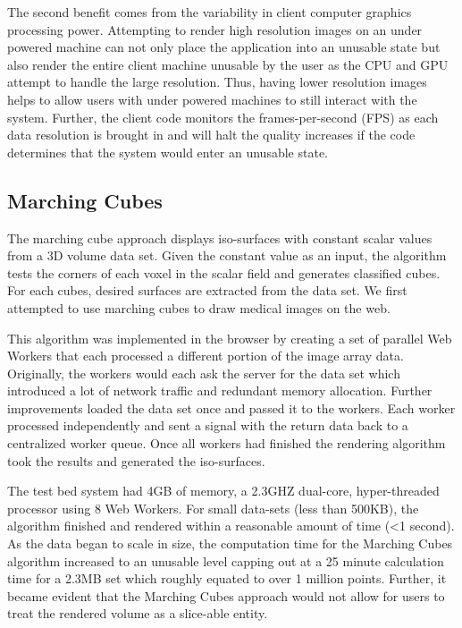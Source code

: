 \documentclass[annual]{acmsiggraph}
\begin{document}
The second benefit comes from the variability in client computer graphics processing power.  Attempting to render high resolution images on an under powered machine can not only place the application into an unusable state but also render the entire client machine unusable by the user as the CPU and GPU attempt to handle the large resolution.  Thus, having lower resolution images helps to allow users with under powered machines to still interact with the system.  Further, the client code monitors the frames-per-second (FPS) as each data resolution is brought in and will halt the quality increases if the code determines that the system would enter an unusable state.

\subsection{Marching Cubes}
	The marching cube \cite{lorensen:1987} approach displays iso-surfaces with constant scalar values from a 3D volume data set. Given the constant value as an input, the algorithm tests the corners of each voxel in the scalar field and generates classified cubes. For each cubes, desired surfaces are extracted from the data set. We first attempted to use marching cubes to draw medical images on the web.

	This algorithm was implemented in the browser by creating a set of parallel Web Workers that each processed a different portion of the image array data.  Originally, the workers would each ask the server for the data set which introduced a lot of network traffic and redundant memory allocation.  Further improvements loaded the data set once and passed it to the workers.  Each worker processed independently and sent a signal with the return data back to a centralized worker queue.  Once all workers had finished the rendering algorithm took the results and generated the iso-surfaces.  
	
	The test bed system had 4GB of memory, a 2.3GHZ dual-core, hyper-threaded processor using 8 Web Workers.  For small data-sets (less than 500KB), the algorithm finished and rendered within a reasonable amount of time (\textless 1 second).  As the data began to scale in size, the computation time for the Marching Cubes algorithm increased to an unusable level capping out at a 25 minute calculation time for a 2.3MB set which roughly equated to over 1 million points.  Further, it became evident that the Marching Cubes approach would not allow for users to treat the rendered volume as a slice-able entity.
\end{document}
